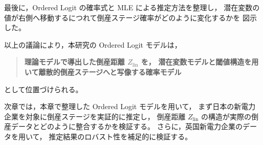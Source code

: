 最後に，Ordered Logit の確率式と MLE による推定方法を整理し，
潜在変数の値が右側へ移動するにつれて倒産ステージ確率がどのように変化するかを
図示した。

以上の議論により，本研究の Ordered Logit モデルは，

\begin{quote}
\textbf{理論モデルで導出した倒産距離 $Z_{\text{lin}}$ を，
潜在変数モデルと閾値構造を用いて離散的倒産ステージへと写像する確率モデル}
\end{quote}

として位置づけられる。

次章では，本章で整理した Ordered Logit モデルを用いて，
まず日本の新電力企業を対象に倒産ステージを実証的に推定し，
倒産距離 $Z_{\text{lin}}$ の構造が実際の倒産データとどのように整合するかを検証する。
さらに，英国新電力企業のデータを用いて，
推定結果のロバスト性を補足的に検証する。
